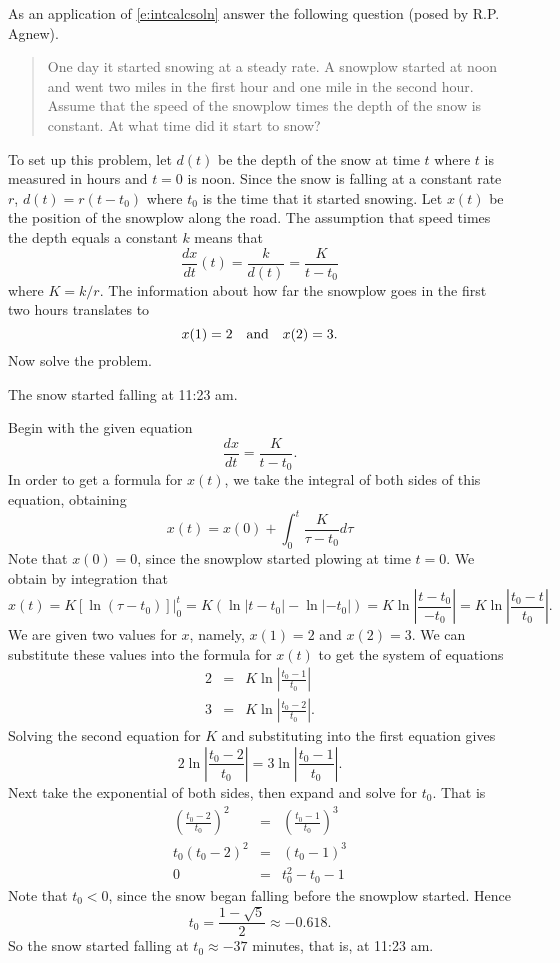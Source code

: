 \documentclass{ximera}
\begin{document}
\begin{exercise} \label{c3.1.7}
As an application of \eqref{e:intcalcsoln} answer the following question
(posed by R.P. Agnew).
\begin{quote}
One day it started snowing at a steady rate.  A snowplow started at
noon and went two miles in the first hour and one mile in the second
hour.  Assume that the speed of the snowplow times the depth of the
snow is constant.  At what time did it start to snow?
\end{quote}

\noindent To set up this problem, let $d(t)$ be the depth of the snow
at time $t$ where $t$ is measured in hours and $t=0$ is noon.
Since the snow is falling at a constant rate $r$, $d(t)= r(t-t_0)$
where $t_0$ is the time that it started snowing.  Let $x(t)$ be the
position of the snowplow along the road.  The assumption that speed
times the depth equals a constant $k$ means that
\[
\frac{dx}{dt}(t) = \frac{k}{d(t)} = \frac{K}{t-t_0}
\]
where $K=k/r$.  The information about how far the snowplow goes in the
first two hours translates to
\[
x(1) = 2  \quad\mbox{and}\quad x(2) =3.
\]
Now solve the problem.

\begin{solution}

\ans The snow started falling at 11:23 am.

\soln Begin with the given equation
\[
\frac{dx}{dt} = \frac{K}{t-t_0}.
\]
In order to get a formula for $x(t)$, we take the integral of both sides of
this equation, obtaining
\[
x(t) = x(0) + \int_{0}^{t} \frac{K}{\tau-t_0} d\tau
\]
Note that $x(0) = 0$, since the snowplow started plowing at time $t=0$.  We
obtain by integration that
\[
x(t) = \left.K[\ln(\tau - t_0)]\right|_{0}^{t} = K(\ln|t - t_0| - \ln|-t_0|) = 
K\ln\left|\frac{t - t_0}{-t_0}\right| = K\ln\left|\frac{t_0-t}{t_0}\right|.
\]
We are given two values for $x$, namely, $x(1) = 2$ and $x(2) = 3$.  We can
substitute these values into the formula for $x(t)$ to get the system of 
equations
\[
\begin{array}{rcl}
2 & = & K\ln\left|\frac{t_0 - 1}{t_0}\right| \\
3 & = & K\ln\left|\frac{t_0 - 2}{t_0}\right|.
\end{array}
\]
Solving the second equation for $K$ and substituting into the first equation 
gives
\[
2\ln\left|\frac{t_0 - 2}{t_0}\right| = 3\ln\left|\frac{t_0 - 1}{t_0}\right|.
\]
Next take the exponential of both sides, then expand and solve for $t_0$. 
That is
\[
\begin{array}{rcl}
\left(\frac{t_0 - 2}{t_0}\right)^2 & = & \left(\frac{t_0 - 1}{t_0}\right)^3 \\
t_0\left(t_0 - 2\right)^2 & = & \left(t_0 - 1\right)^3 \\
0 & = & t_0^2 - t_0 - 1 \end{array}
\]
Note that $t_0 < 0$, since the snow began falling before the snowplow
started.  Hence
\[
t_0 = \frac{1 - \sqrt{5}}{2} \approx -0.618.
\]
So the snow started falling at $t_0 \approx -37$ minutes, that is, at
11:23 am.


\end{solution}
\end{exercise}
\end{document}
